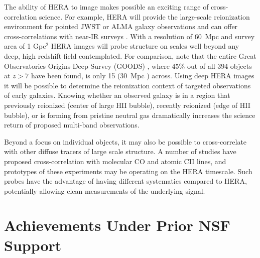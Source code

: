 \documentclass[preprint]{aastex}
\begin{document}
The ability of HERA to image makes possible an exciting range of cross-correlation science.  For example, HERA will provide the large-scale reionization environment for pointed JWST or ALMA 
galaxy observations and can offer cross-correlations with near-IR surveys \citep{lidz_et_al2009}.  With a resolution of 60~Mpc and survey area of 1 Gpc$^2$ HERA images will probe structure on scales well beyond any deep, high redshift field contemplated. For comparison, note that the entire Great Observatories Origins Deep Survey (GOODS) \citep{dickinson_et_al2003}, where 45\% out of all $394$ objects at $z > 7$ have been found, is only 15{\arcmin} (30~Mpc ) across. Using deep HERA images it will be possible to determine the reionization context of targeted observations of early galaxies. Knowing whether an observed galaxy is in a region that previously reionized (center of large HII bubble), recently reionized (edge of HII bubble), or is forming from pristine neutral gas dramatically increases the science return of proposed multi-band observations.

Beyond a focus on individual objects, it may also be possible to cross-correlate with other diffuse tracers of large scale structure.  A number of studies have proposed cross-correlation with molecular CO \cite{lidz_et_al2011} and atomic CII \citep{gong_et_al2011} lines, and prototypes of these experiments may be operating on the HERA timescale.  Such probes have the advantage of having different systematics compared to HERA, potentially allowing clean measurements of the underlying signal.



\section{Achievements Under Prior NSF Support} %
\end{document}
